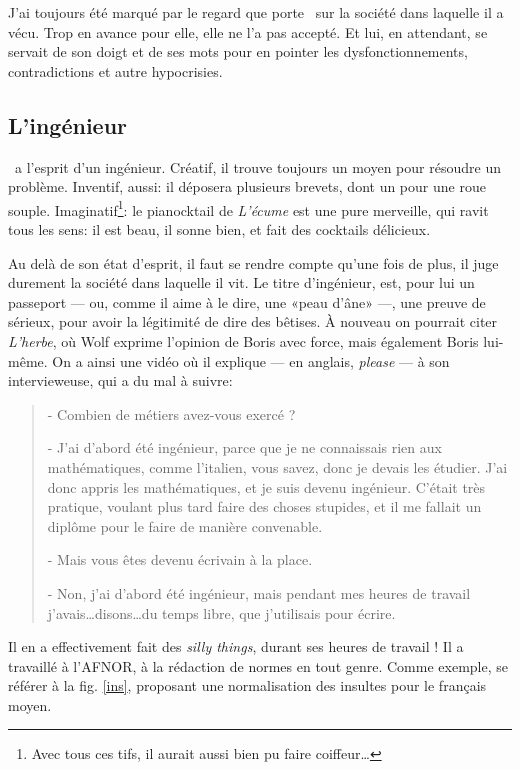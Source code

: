 J'ai toujours été marqué par le regard que porte \BV\ sur la société
dans laquelle il a vécu. Trop en avance pour elle, elle ne l'a pas accepté. Et
lui, en attendant, se servait de son doigt et de ses mots pour en pointer
les dysfonctionnements, contradictions et autre hypocrisies.

\subsection{L'ingénieur}

\BV\ a l'esprit d'un ingénieur. Créatif, il trouve toujours
un moyen pour résoudre un problème. Inventif, aussi: il déposera
plusieurs brevets, dont un pour une roue souple. Imaginatif\footnote{Avec tous ces tifs,
il aurait aussi bien pu faire coiffeur\ldots}: le pianocktail de \emph{L'écume}
est une pure merveille, qui ravit tous les sens: il est beau, il sonne bien,
et fait des cocktails délicieux.

Au delà de son état d'esprit, il faut se rendre compte qu'une fois de plus,
il juge durement la société dans laquelle il vit. Le titre d'ingénieur, est,
pour lui un passeport --- ou, comme il aime à le dire, une «peau d'âne» ---, une
preuve de sérieux, pour avoir la légitimité de dire des bêtises. À nouveau on pourrait
citer \emph{L'herbe}, où Wolf exprime l'opinion de Boris avec force, mais également
Boris lui-même. On a ainsi une vidéo où il explique --- en anglais, \emph{please} ---
à son intervieweuse, qui a du mal à suivre:

{\small
\begin{quotation}
- Combien de métiers avez-vous exercé ?

- J'ai d'abord été ingénieur, parce que je ne connaissais rien aux
mathématiques, comme l'italien, vous savez, donc je devais les étudier.
J'ai donc appris les mathématiques, et je suis devenu ingénieur.
C'était très pratique, voulant plus tard faire des choses stupides,
et il me fallait un diplôme pour le faire de manière convenable.

- Mais vous êtes devenu écrivain à la place.

- Non, j'ai d'abord été ingénieur, mais pendant mes heures de travail
j'avais\ldots disons\ldots du temps libre, que j'utilisais pour écrire.
\end{quotation}
}

Il en a effectivement fait des \emph{silly things}, durant ses heures de travail ! Il a
travaillé à l'AFNOR, à la rédaction de normes en tout genre. Comme exemple, se
référer à la fig. \ref{ins}, proposant une normalisation des insultes pour le français moyen.

